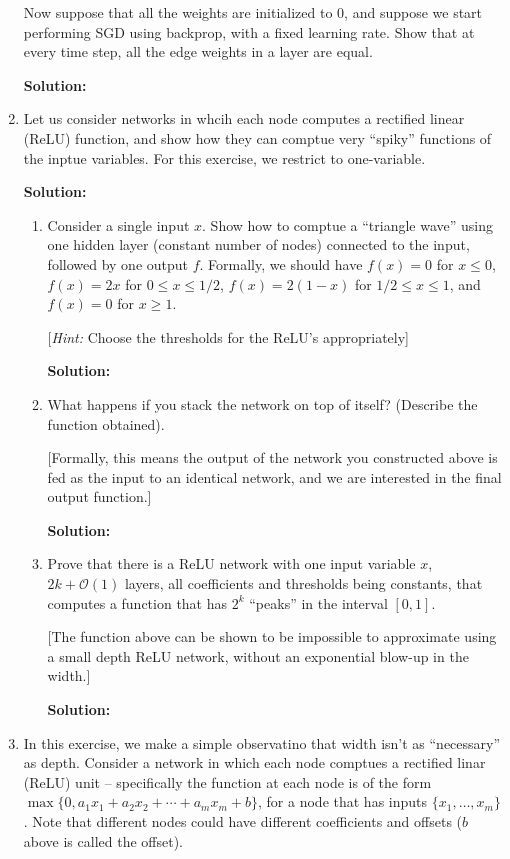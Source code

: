 \documentclass[12pt]{article}
\newcommand{\BigO}[1]{\mathcal{O}\left( #1 \right)}
\begin{document}
\begin{enumerate}
Now suppose that all the weights are initialized to $0$, and suppose we start performing SGD using backprop, with a fixed learning rate. Show that at every time step, all the edge weights in a layer are equal.

   {\bf Solution:}

\item Let us consider networks in whcih each node computes a rectified linear (ReLU) function, and show how they can comptue very ``spiky'' functions of the inptue variables. For this exercise, we restrict to one-variable.

   {\bf Solution:}

\begin{enumerate}
  \item Consider a single input $x$. Show how to comptue a ``triangle wave'' using one hidden layer (constant number of nodes) connected to the input, followed by one output $f$. Formally, we should have $f(x) = 0$ for $x \leq 0$, $f(x) = 2x$ for $0 \leq x \leq 1/2$, $f(x) = 2(1-x)$ for $1/2 \leq x \leq 1$, and $f(x) = 0$ for $x \geq 1$. 

[{\em Hint:} Choose the thresholds for the ReLU's appropriately]

   {\bf Solution:}

\item What happens if you stack the network on top of itself? (Describe the function obtained). 

[Formally, this means the output of the network you constructed above is fed as the input to an identical network, and we are interested in the final output function.]

   {\bf Solution:}

\item Prove that there is a ReLU network with one input variable $x$, $2k + \BigO{1}$ layers, all coefficients and thresholds being constants, that computes a function that has $2^{k}$ ``peaks'' in the interval $[0,1]$.

[The function above can be shown to be impossible to approximate using a small depth ReLU network, without an exponential blow-up in the width.]

   {\bf Solution:}

\end{enumerate}

\item In this exercise, we make a simple observatino that width isn't as ``necessary'' as depth. Consider a network in which each node comptues a rectified linar (ReLU) unit -- specifically the function at each node is of the form $\max \{0, a_{1}x_{1} + a_{2}x_{2} + \cdots + a_{m}x_{m} + b\}$, for a node that has inputs $\{ x_{1}, \ldots, x_{m}\}$. Note that different nodes could have different coefficients and offsets ($b$ above is called the offset).


\end{enumerate}
\end{document}

